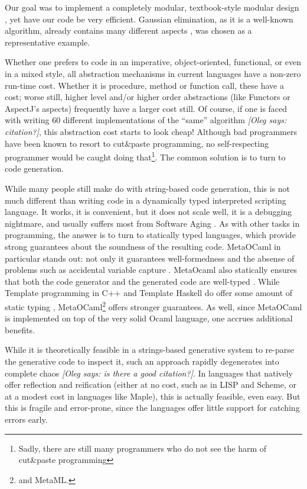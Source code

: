 \documentclass{llncs}
\newcommand{\oleg}[1]{{\it [Oleg says: #1]}}
\begin{document}
Our goal was to implement a completely modular, textbook-style 
modular design \cite{journals/cacm/parnas72a}, yet 
have our code be very efficient.  Gaussian elimination, as it is a  
well-known algorithm, already contains many different aspects 
\cite{carette04}, was chosen as a representative example.

Whether one prefers to code in an imperative, object-oriented, functional, 
or even in a mixed style, all abstraction mechanisms in current
languages have a non-zero run-time cost.  Whether it is procedure,
method or function call, these have a cost; worse still, higher level
and/or higher order abstractions (like Functors or AspectJ's aspects)
frequently have a larger cost still.  Of course, if one is faced with
writing 60 different implementations of the ``same'' algorithm
\oleg{citation?}, this
abstraction cost starts to look cheap!  Although bad programmers have
been known to resort to cut\&paste programming, no self-respecting
programmer would be caught doing that\footnote{Sadly, there are still
many programmers who do not see the harm of cut\&paste programming}.
The common solution is to turn to code generation.

While many people still make do with string-based code generation,
this is not much different than writing code in a dynamically typed
interpreted scripting language.  It works, it is convenient, but it
does not scale well, it is a debugging nightmare, and usually suffers
most from Software Aging \cite{parnas_aging}.  As with other tasks in
programming, the answer is to turn to statically typed languages,
which provide strong guarantees about the soundness of the resulting
code.  MetaOCaml \cite{CTHL03,metaocaml-org} in particular stands
out: not only it guarantees well-formedness and the absense of problems 
such as accidental variable capture \cite{HygienicMacros}. MetaOcaml also
statically ensures that both the code generator and the generated code
are well-typed \cite{TahaSheard97,TahaThesis}.  While Template
programming in C++ and Template Haskell do offer some amount of static
typing \cite{conf/dagstuhl/CzarneckiOST03}, MetaOCaml\footnote{and
  MetaML.} offers stronger guarantees.  As well, since MetaOCaml is
implemented on top of the very solid Ocaml language, one accrues
additional benefits.

While it is theoretically feasible in a strings-based
generative system to re-parse the generative code to inspect it, such
an approach rapidly degenerates into complete chaos \oleg{is there a
  good citation?}.  In languages
that natively offer reflection and reification (either at no cost, 
such as in LISP and Scheme, or at a modest cost in languages like 
Maple), this is actually feasible, even easy.  But this is fragile
and error-prone, since the languages offer little support for catching
errors early.
\end{document}
